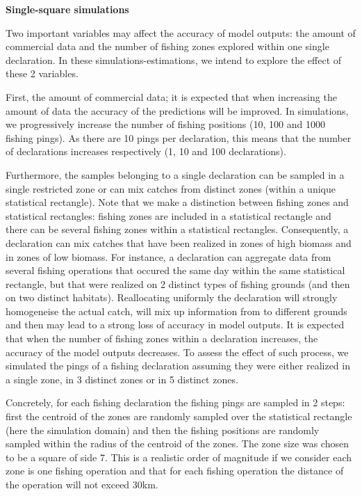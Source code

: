 \documentclass[
  english,
  man,floatsintext]{apa6}
\begin{document}
\textbf{Single-square simulations}

Two important variables may affect the accuracy of model outputs: the amount of commercial data and the number of fishing zones explored within one single declaration. In these simulations-estimations, we intend to explore the effect of these 2 variables.

First, the amount of commercial data; it is expected that when increasing the amount of data the accuracy of the predictions will be improved. In simulations, we progressively increase the number of fishing positions (10, 100 and 1000 fishing pings). As there are 10 pings per declaration, this means that the number of declarations increases respectively (1, 10 and 100 declarations).

Furthermore, the samples belonging to a single declaration can be sampled in a single restricted zone or can mix catches from distinct zones (within a unique statistical rectangle). Note that we make a distinction between fishing zones and statistical rectangles: fishing zones are included in a statistical rectangle and there can be several fishing zones within a statistical rectangles. Consequently, a declaration can mix catches that have been realized in zones of high biomass and in zones of low biomass. For instance, a declaration can aggregate data from several fishing operations that occured the same day within the same statistical rectangle, but that were realized on 2 distinct types of fishing grounds (and then on two distinct habitats). Reallocating uniformly the declaration will strongly homogeneise the actual catch, will mix up information from to different grounds and then may lead to a strong loss of accuracy in model outputs. It is expected that when the number of fishing zones within a declaration increases, the accuracy of the model outputs decreases. To assess the effect of such process, we simulated the pings of a fishing declaration assuming they were either realized in a single zone, in 3 distinct zones or in 5 distinct zones.

Concretely, for each fishing declaration the fishing pings are sampled in 2 steps: first the centroid of the zones are randomly sampled over the statistical rectangle (here the simulation domain) and then the fishing positions are randomly sampled within the radius of the centroid of the zones. The zone size was chosen to be a square of side 7. This is a realistic order of magnitude if we consider each zone is one fishing operation and that for each fishing operation the distance of the operation will not exceed 30km.
\end{document}
